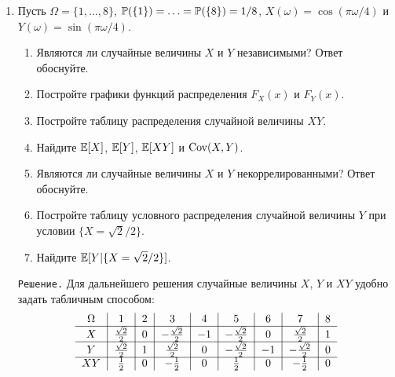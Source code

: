\documentclass[12pt, a4paper]{article}\usepackage[]{graphicx}\usepackage[]{color}
\begin{document}
\begin{enumerate}
(c) $\E[X] = \int_{-\infty}^{\infty}xf_X(x)dx = \int_{-3}^{3}x\left(-\frac{x^2}{36} + \tfrac{1}{4}\right)dx = 0$.

(d)
\begin{multline}
\E[X^2] = \int_{-\infty}^{\infty}x^2f_X(x)dx = \int_{-3}^{3}x^2\left(-\frac{x^2}{36} + \tfrac{1}{4}\right)dx = \int_{-3}^{3}\left(-\frac{x^4}{36} + \tfrac{x^2}{4}\right)dx = -\left.\tfrac{x^5}{5\cdot36}\right|_{x=-3}^{x=3} + \left.\tfrac{x^3}{3\cdot4}\right|_{x=-3}^{x=3} = \\
= \tfrac{9}{5}
\end{multline}
Следовательно, $\Var[X] = \tfrac{9}{5}$. $\Box$
\item %

Пусть $\Omega = \{1,\ldots,8\}$, $\P(\{1\}) = \ldots = \P(\{8\}) = 1/8$, $X(\omega) = \cos(\pi\omega/4)$ и $Y(\omega) = \sin(\pi\omega/4)$.
\begin{enumerate}
  \item Являются ли случайные величины $X$ и $Y$ независимыми? Ответ обоснуйте.
  \item Постройте графики функций распределения $F_X(x)$ и $F_Y(x)$.
  \item Постройте таблицу распределения случайной величины $XY$.
  \item Найдите $\E[X]$, $\E[Y]$, $\E[XY]$ и $\Cov(X,Y)$.
  \item Являются ли случайные величины $X$ и $Y$ некоррелированными? Ответ обоснуйте.
  \item Постройте таблицу условного распределения случайной величины $Y$ при условии $\{X = \sqrt{2}/2\}$.
  \item Найдите $\E[Y|\{X = \sqrt{2}/2\}]$.
\end{enumerate}

\verb"Решение." Для дальнейшего решения случайные величины $X$, $Y$ и $XY$ удобно задать табличным способом:
\[
\begin{tabular}{c|c|c|c|c|c|c|c|c}
  $\Omega$       & $1$                      & $2$     & $3$                      & $4$     & $5$                     & $6$     & $7$                    & $8$    \\ \cline{1-9}
  $X$            & $\frac{\sqrt{2}}{2}$     & $0$     & $-\frac{\sqrt{2}}{2}$    & $-1$    & $-\frac{\sqrt{2}}{2}$   & $0$     & $\frac{\sqrt{2}}{2}$   & $1$    \\ \cline{1-9}
  $Y$            & $\frac{\sqrt{2}}{2}$     & $1$     & $\frac{\sqrt{2}}{2}$     & $0$     & $-\frac{\sqrt{2}}{2}$   & $-1$    & $-\frac{\sqrt{2}}{2}$  & $0$    \\ \cline{1-9}
  $XY$           & $\frac{1}{2}$            & $0$     & $-\frac{1}{2}$           & $0$     & $\frac{1}{2}$           & $0$     & $-\frac{1}{2}$         & $0$    \\
\end{tabular}
\]


\end{enumerate}
\end{document}
